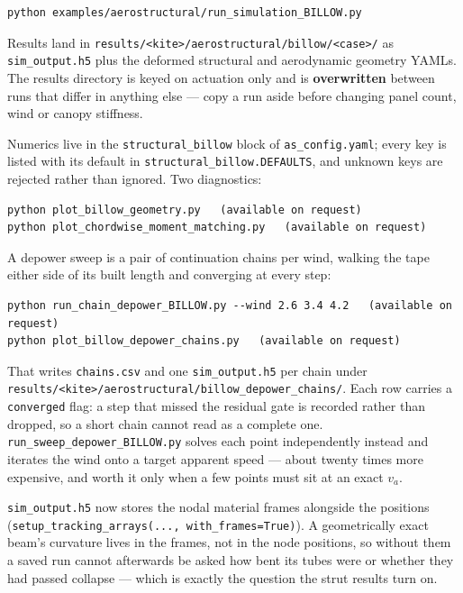 \documentclass[11pt,a4paper]{article}
\newcommand{\code}[1]{\texttt{\small #1}}
\begin{document}
\begin{verbatim}
python examples/aerostructural/run_simulation_BILLOW.py
\end{verbatim}

Results land in \code{results/<kite>/aerostructural/billow/<case>/} as
\code{sim\_output.h5} plus the deformed structural and aerodynamic geometry
YAMLs. The results directory is keyed on actuation only and is
\textbf{overwritten} between runs that differ in anything else --- copy a run
aside before changing panel count, wind or canopy stiffness.

Numerics live in the \code{structural\_billow} block of \code{as\_config.yaml};
every key is listed with its default in \code{structural\_billow.DEFAULTS}, and
unknown keys are rejected rather than ignored. Two diagnostics:

\begin{verbatim}
python plot_billow_geometry.py   (available on request)
python plot_chordwise_moment_matching.py   (available on request)
\end{verbatim}

A depower sweep is a pair of continuation chains per wind, walking the tape
either side of its built length and converging at every step:

\begin{verbatim}
python run_chain_depower_BILLOW.py --wind 2.6 3.4 4.2   (available on request)
python plot_billow_depower_chains.py   (available on request)
\end{verbatim}

\noindent That writes \code{chains.csv} and one \code{sim\_output.h5} per chain
under \code{results/<kite>/aerostructural/billow\_depower\_chains/}. Each row
carries a \code{converged} flag: a step that missed the residual gate is
recorded rather than dropped, so a short chain cannot read as a complete one.
\code{run\_sweep\_depower\_BILLOW.py} solves each point independently instead
and iterates the wind onto a target apparent speed --- about twenty times more
expensive, and worth it only when a few points must sit at an exact $v_a$.

\code{sim\_output.h5} now stores the nodal material frames alongside the
positions (\code{setup\_tracking\_arrays(..., with\_frames=True)}). A
geometrically exact beam's curvature lives in the frames, not in the node
positions, so without them a saved run cannot afterwards be asked how bent its
tubes were or whether they had passed collapse --- which is exactly the question
the strut results turn on.
\end{document}
